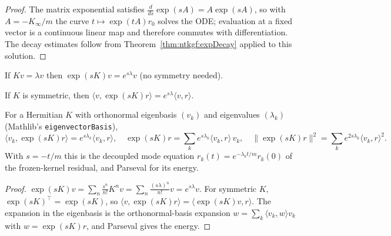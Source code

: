 \begin{proof}
  \leanok
The matrix exponential satisfies $\frac{d}{ds}\exp(sA)=A\exp(sA)$, so with $A=-K_\infty/m$ the curve $t\mapsto\exp(tA)r_0$ solves the ODE; evaluation at a fixed
vector is a continuous linear map and therefore commutes with differentiation. The decay estimates follow from Theorem~\ref{thm:ntkgf:expDecay}
applied to this solution.
\end{proof}

\begin{theorem}\label{thm:ntkgf:eigenmodes}
  \leanok
If $Kv=\lambda v$ then $\exp(sK)v=e^{s\lambda}v$ (no symmetry needed). 

If $K$ is symmetric, then $\langle v,\exp(sK)r\rangle=e^{s\lambda}\langle v,r\rangle$.

For a Hermitian $K$ with orthonormal eigenbasis $(v_k)$ and eigenvalues $(\lambda_k)$ (Mathlib's \texttt{eigenvectorBasis}),
\[
  \langle v_k,\exp(sK)r\rangle=e^{s\lambda_k}\langle v_k,r\rangle,\quad
  \exp(sK)r=\sum_ke^{s\lambda_k}\langle v_k,r\rangle\,v_k,\quad
  \|\exp(sK)r\|^2=\sum_ke^{2s\lambda_k}\langle v_k,r\rangle^2 .
\]
With $s=-t/m$ this is the decoupled mode equation $r_k(t)=e^{-\lambda_kt/m}r_k(0)$ of the frozen-kernel residual, and Parseval for its energy.
\end{theorem}

\begin{proof}
  \leanok
$\exp(sK)v=\sum_n\frac{s^n}{n!}K^nv=\sum_n\frac{(s\lambda)^n}{n!}v=e^{s\lambda}v$. For symmetric $K$, $\exp(sK)^\top=\exp(sK)$, so
$\langle v,\exp(sK)r\rangle=\langle\exp(sK)v,r\rangle$. The expansion in the eigenbasis is the orthonormal-basis expansion
$w=\sum_k\langle v_k,w\rangle v_k$ with $w=\exp(sK)r$, and Parseval gives the energy.
\end{proof}

